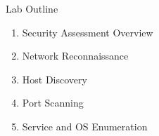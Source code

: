 \begin{frame}{Lab Outline}
  \begin{enumerate}
    \item Security Assessment Overview
    \item Network Reconnaissance
    \item Host Discovery
    \item Port Scanning
    \item Service and OS Enumeration
  \end{enumerate}
\end{frame}
